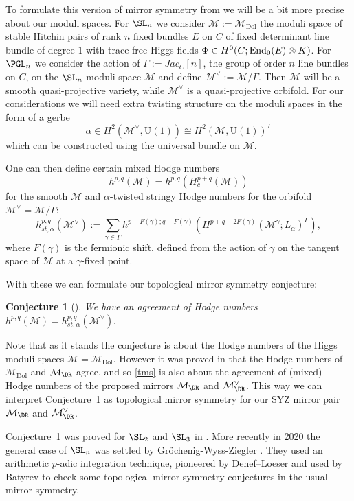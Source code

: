\documentclass[12pt]{article}
\numberwithin{equation}{section}
\newtheorem{conjecture}[theorem]{Conjecture}
\theoremstyle{remark}
\numberwithin{theorem}{section}
\def\M{{\mathcal{M}}}
\newcommand{\End}{\textnormal{End}}
\def\U{{\mathrm{U}}}
\newcommand{\Dol}{{\mathrm{Dol}}}
\numberwithin{equation}{section}
\begin{document}
To formulate this version of mirror symmetry from \cite{hausel-thaddeus} we will be a bit more precise about our moduli spaces. For $\SL_n$ we consider $\M:=\M_\Dol$ the moduli space of stable Hitchin pairs of rank $n$ fixed bundles $E$ on $C$ of fixed determinant line bundle of  degree $1$  with trace-free Higgs fields $\Phi\in H^0(C;\End_0(E)\otimes K)$. For $\PGL_n$ we consider the action of $\Gamma:=Jac_C[n]$, the group of order $n$ line bundles on $C$, on the $\SL_n$ moduli space $\M$ and define $\M^\vee:=\M/\Gamma$. Then $\M$ will be a smooth quasi-projective variety, while $\M^\vee$ is a quasi-projective orbifold.  For our considerations we will need extra twisting structure on the moduli spaces in the form of a gerbe $$\alpha\in H^2(\M^\vee,\U(1))\cong H^2(\M,\U(1))^\Gamma$$ which can be constructed using   the universal bundle on $\M$. 

One can then define  certain mixed Hodge numbers $$h^{p,q}(\M)=h^{p,q}(H^{p+q}_c(\M))$$ for the smooth $\M$ and $\alpha$-twisted stringy Hodge numbers for the orbifold $\M^\vee=\M/\Gamma$:  $$h_{st,\alpha}^{p,q}(\M^\vee):=\sum_{\gamma\in \Gamma} h^{p-F(\gamma);q-F(\gamma)}(H^{p+q-2F(\gamma)}(\M^\gamma;L_{\alpha})^\Gamma),$$ where $F(\gamma)$ is the fermionic shift, defined from the action of $\gamma$ on the tangent space of $\M$ at a $\gamma$-fixed point.

With these we can formulate our topological mirror symmetry conjecture:

\begin{conjecture}[\cite{hausel-thaddeus}] \label{tms} We have an agreement of Hodge numbers $h^{p,q}(\M)=h_{st,\alpha}^{p,q}(\M^\vee).$
\end{conjecture}
Note that as it stands the conjecture is about the Hodge numbers of the Higgs moduli spaces $\M=\M_{\Dol}$. However it was proved in  \cite{hausel-thaddeus} that the Hodge numbers of $\M_\Dol$ and $\M_{\DR}$ agree, and so \eqref{tms} is also about the agreement of (mixed) Hodge numbers of the proposed mirrors $\M_{\DR}$ and $\M^\vee_{\DR}$. This way we can interpret Conjecture~\ref{tms} as topological mirror symmetry for our SYZ mirror pair $\M_{\DR}$ and $\M^\vee_{\DR}$. 

Conjecture~\ref{tms} was proved for $\SL_2$ and $\SL_3$ in \cite{hausel-thaddeus}. More recently in 2020 the general case of $\SL_n$ was settled by Gr\"ochenig-Wyss-Ziegler \cite{groechenig-etal1}.  They used an arithmetic $p$-adic integration technique, pioneered  by Denef--Loeser \cite{denef-loeser} and used by Batyrev \cite{batyrev2} to check some topological mirror symmetry conjectures in the usual mirror symmetry. 
\end{document}
